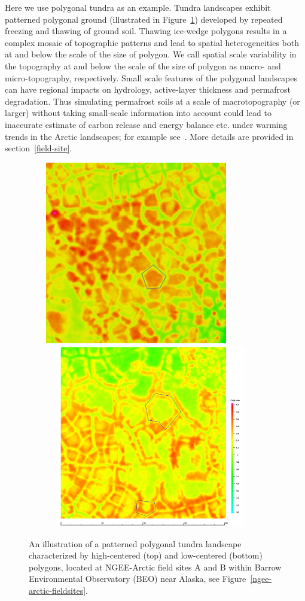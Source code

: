 \documentclass[review,11pt]{elsarticle}
\begin{document}
Here we use polygonal tundra as an example. Tundra landscapes exhibit patterned polygonal ground (illustrated in Figure~\ref{tundra-sitesA-B}) developed by repeated freezing and thawing of ground soil. Thawing ice-wedge polygons results in a complex mosaic of topographic patterns and lead to spatial heterogeneities both at and below the scale of the size of polygon. We call spatial scale variability in the topography at and below the scale of the size of polygon as macro- and micro-topography, respectively. Small scale features of the polygonal landscapes can have regional impacts on hydrology, active-layer thickness and permafrost degradation. Thus simulating permafrost soils at a scale of macrotopography (or larger) without taking small-scale information into account could lead to inaccurate estimate of carbon release and energy balance etc. under warming trends in the Arctic landscapes; for example see~\cite{liljedahl2016pan,lu2012modeling,andresen2015disappearing,holden2005peatland}. More details are provided in section~\ref{field-site}.
\begin{figure}[!h]
\centering
\includegraphics[width=9.5cm, height=8cm]{./figures/DEM_Area_B-HCP.png} \\
\hspace*{0.8cm}\includegraphics[width=10.8cm, height=8cm]{./figures/DEM_Area_A-LCP.png}
\caption{An illustration of a patterned polygonal tundra landscape characterized by high-centered (top) and low-centered (bottom) polygons, located at NGEE-Arctic field sites A and B within Barrow Environmental Observatory (BEO) near Alaska, see Figure~\ref{ngee-arctic-fieldsites}.}
\label{tundra-sitesA-B}
\end{figure}
\end{document}
